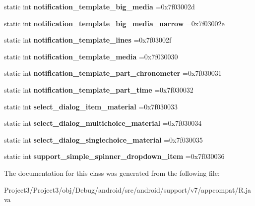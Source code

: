 \begin{DoxyCompactItemize}
static int {\bfseries notification\+\_\+template\+\_\+big\+\_\+media} =0x7f03002d
\item 
\mbox{\label{classandroid_1_1support_1_1v7_1_1appcompat_1_1R_1_1layout_a2a847d90ce54ca880e3cd909b2bc17e7}} 
static int {\bfseries notification\+\_\+template\+\_\+big\+\_\+media\+\_\+narrow} =0x7f03002e
\item 
\mbox{\label{classandroid_1_1support_1_1v7_1_1appcompat_1_1R_1_1layout_a9c9ca525046c6e0247f2df231d366497}} 
static int {\bfseries notification\+\_\+template\+\_\+lines} =0x7f03002f
\item 
\mbox{\label{classandroid_1_1support_1_1v7_1_1appcompat_1_1R_1_1layout_a5513f86d2b38820d357d61605081cc30}} 
static int {\bfseries notification\+\_\+template\+\_\+media} =0x7f030030
\item 
\mbox{\label{classandroid_1_1support_1_1v7_1_1appcompat_1_1R_1_1layout_ae7f90d64b0097fc6b6a3af0d2b68a734}} 
static int {\bfseries notification\+\_\+template\+\_\+part\+\_\+chronometer} =0x7f030031
\item 
\mbox{\label{classandroid_1_1support_1_1v7_1_1appcompat_1_1R_1_1layout_a9dcff11fdc17e4d31aa759c96ec08d73}} 
static int {\bfseries notification\+\_\+template\+\_\+part\+\_\+time} =0x7f030032
\item 
\mbox{\label{classandroid_1_1support_1_1v7_1_1appcompat_1_1R_1_1layout_ad7d89bccb0780f781829351eaa3c97ab}} 
static int {\bfseries select\+\_\+dialog\+\_\+item\+\_\+material} =0x7f030033
\item 
\mbox{\label{classandroid_1_1support_1_1v7_1_1appcompat_1_1R_1_1layout_ae3d07222fe052a095ac753bd143f168a}} 
static int {\bfseries select\+\_\+dialog\+\_\+multichoice\+\_\+material} =0x7f030034
\item 
\mbox{\label{classandroid_1_1support_1_1v7_1_1appcompat_1_1R_1_1layout_ad41640733144926e92743d75283fdeef}} 
static int {\bfseries select\+\_\+dialog\+\_\+singlechoice\+\_\+material} =0x7f030035
\item 
\mbox{\label{classandroid_1_1support_1_1v7_1_1appcompat_1_1R_1_1layout_ae6377b2fea675cca27711f323cb30463}} 
static int {\bfseries support\+\_\+simple\+\_\+spinner\+\_\+dropdown\+\_\+item} =0x7f030036
\end{DoxyCompactItemize}


The documentation for this class was generated from the following file\+:\begin{DoxyCompactItemize}
\item 
Project3/\+Project3/obj/\+Debug/android/src/android/support/v7/appcompat/R.\+java\end{DoxyCompactItemize}
